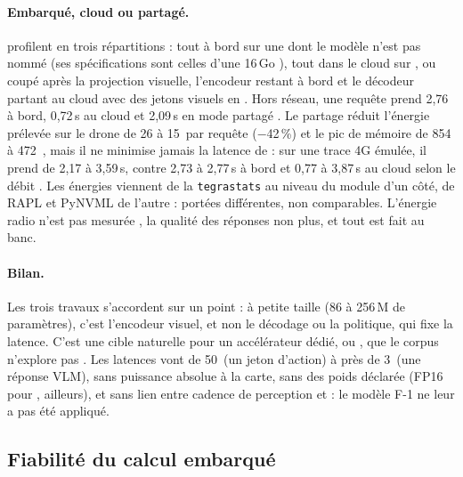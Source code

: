\paragraph{Embarqué, cloud ou partagé.} \citet{arxiv-2609.25415-cloud-edge-split-profiling-onboard}\pp{}
profilent  en trois répartitions : tout à bord sur une  dont le modèle
n'est pas nommé (ses spécifications sont celles d'une  16\,Go \deduit), tout dans
le cloud sur , ou coupé après la projection visuelle, l'encodeur restant à bord et
le décodeur partant au cloud avec des jetons visuels en  . Hors
réseau, une requête prend 2,76\, à bord, 0,72\,s au cloud et 2,09\,s en mode partagé
\med. Le partage réduit l'énergie prélevée sur le drone de 26 à 15\, par requête
($-$42\,\%) et le pic de mémoire  de 854 à 472\, , mais il ne
minimise jamais la latence de  : sur une trace 4G émulée, il prend de 2,17 à
3,59\,s, contre 2,73 à 2,77\,s à bord et 0,77 à 3,87\,s au cloud selon le débit
. Les énergies viennent de la  \texttt{tegrastats} au
niveau du module d'un côté, de RAPL et PyNVML de l'autre : portées différentes, non
comparables. L'énergie radio n'est pas mesurée \deduit, la qualité des réponses non plus,
et tout est fait au banc.

\paragraph{Bilan.} Les trois travaux s'accordent sur un point : à petite taille (86 à
256\,M de paramètres), c'est l'encodeur visuel, et non le décodage ou la politique, qui
fixe la latence. C'est une cible naturelle pour un accélérateur dédié,  ou , que
le corpus n'explore pas \deduit. Les latences vont de 50\, (un jeton d'action) à près
de 3\, (une réponse VLM), sans puissance absolue à la carte, sans  des
poids déclarée (FP16 pour , \nr{} ailleurs), et sans lien entre cadence de perception et  : le
modèle F-1 ne leur a pas été appliqué.

\subsection{Fiabilité du calcul embarqué}

